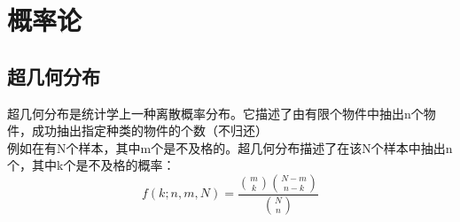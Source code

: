 \documentclass[../main.tex]{subfiles}
\begin{document}
\chapter{概率论}
	\section{超几何分布}
		超几何分布是统计学上一种离散概率分布。它描述了由有限个物件中抽出n个物件，成功抽出指定种类的物件的个数（不归还）\\
		例如在有N个样本，其中m个是不及格的。超几何分布描述了在该N个样本中抽出n个，其中k个是不及格的概率： \\
		$$  f(k;n,m,N) = \frac{\binom{m}{k} \binom{N-m}{n-k}}{\binom{N}{n}} $$
\end{document}
